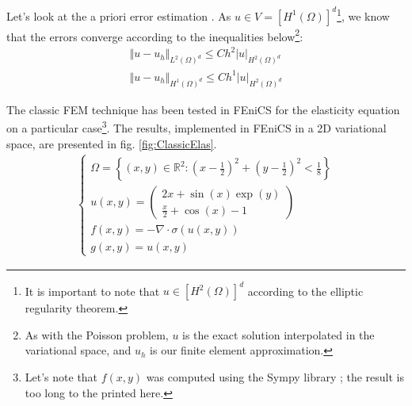 Let's look at the a priori error estimation \parencite[p.159]{ern2013theory}. As $u \in V = \left[  H^1(\Omega)\right]^d$\footnote{It is important to note that $u \in \left[  H^2(\Omega)\right]^d$ according to the elliptic regularity theorem.}, we know that the errors converge according to the inequalities below\footnote{As with the Poisson problem, $u$ is the exact solution interpolated in the variational space, and $u_h$ is our finite element approximation.}:
\begin{align}
    \Vert u - u_h \Vert_{L^2(\Omega)^d} \leq C h^2 \vert u \vert_{H^2(\Omega)^d} \\
    \Vert u - u_h \Vert_{H^1(\Omega)^d} \leq C h^1 \vert u \vert_{H^2(\Omega)^d}
\end{align} 

The classic FEM technique has been tested in FEniCS for the elasticity equation on a particular case\footnote{Let's note that $f(x,y)$ was computed using the Sympy library ; the result is too long to the printed here.}. The results, implemented in FEniCS in a 2D variational space, are presented in fig. \ref{fig:ClassicElas}.
\begin{align}
    \begin{cases}
    \Omega = \left\{ (x,y)\in\mathbb{R}^2: \left( x-\frac{1}{2} \right)^2 + \left( y-\frac{1}{2} \right)^2 < \frac{1}{8}  \right\} \\
    u(x,y)= \begin{pmatrix}
        2x + \sin(x)\exp(y) \\ \frac{x}{2} + \cos(x) - 1
    \end{pmatrix}  \\
    f(x,y) = -\nabla \cdot \sigma(u(x,y)) \\
    g(x,y) = u(x,y)
    \end{cases}
    \label{eq:test3}
\end{align}

